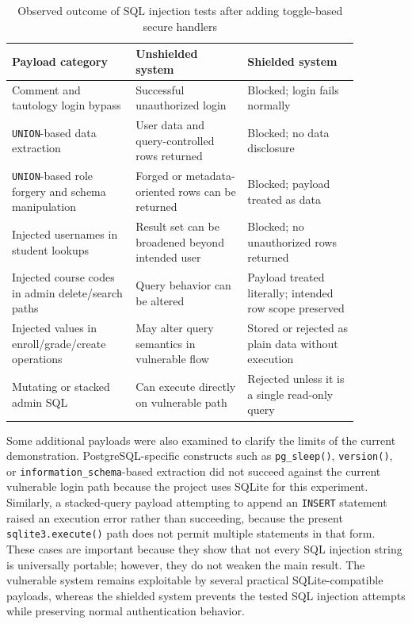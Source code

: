 \documentclass[11pt,a4paper]{article}
\begin{document}
\begin{table}[h]
\centering
\caption{Observed outcome of SQL injection tests after adding toggle-based secure handlers}
\begin{tabular}{p{0.31\linewidth} p{0.28\linewidth} p{0.28\linewidth}}
\toprule
\textbf{Payload category} & \textbf{Unshielded system} & \textbf{Shielded system} \\
\midrule
Comment and tautology login bypass & Successful unauthorized login & Blocked; login fails normally \\
\texttt{UNION}-based data extraction & User data and query-controlled rows returned & Blocked; no data disclosure \\
\texttt{UNION}-based role forgery and schema manipulation & Forged or metadata-oriented rows can be returned & Blocked; payload treated as data \\
Injected usernames in student lookups & Result set can be broadened beyond intended user & Blocked; no unauthorized rows returned \\
Injected course codes in admin delete/search paths & Query behavior can be altered & Payload treated literally; intended row scope preserved \\
Injected values in enroll/grade/create operations & May alter query semantics in vulnerable flow & Stored or rejected as plain data without execution \\
Mutating or stacked admin SQL & Can execute directly on vulnerable path & Rejected unless it is a single read-only query \\
\bottomrule
\end{tabular}
\end{table}

Some additional payloads were also examined to clarify the limits of the current demonstration. PostgreSQL-specific constructs such as \texttt{pg\_sleep()}, \texttt{version()}, or \texttt{information\_schema}-based extraction did not succeed against the current vulnerable login path because the project uses SQLite for this experiment. Similarly, a stacked-query payload attempting to append an \texttt{INSERT} statement raised an execution error rather than succeeding, because the present \texttt{sqlite3.execute()} path does not permit multiple statements in that form. These cases are important because they show that not every SQL injection string is universally portable; however, they do not weaken the main result. The vulnerable system remains exploitable by several practical SQLite-compatible payloads, whereas the shielded system prevents the tested SQL injection attempts while preserving normal authentication behavior.
\end{document}
